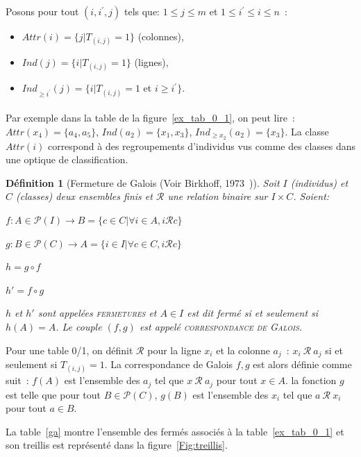 \documentclass[a4paper]{report}
\newtheorem{definition}{Définition}[chapter]
\begin{document}
Posons pour tout $(i, i^{'}, j)$ tels que: $1 \leq j \leq m$ et $1 \leq i^{'} \leq i \leq n$~:
\begin{itemize}
    \item $Attr(i) = \{j | T_{(i, j)} = 1 \}$ (colonnes),
    \item $Ind(j) = \{i | T_{(i, j)} = 1 \}$ (lignes),
    \item $Ind_{\geqslant i^{'}}(j) = \{i | T_{(i, j)} = 1$ et $i \geqslant i^{'} \}$.
\end{itemize}


\paragraph{}Par exemple dans la table de la figure~\ref{ex_tab_0_1}, on peut lire~: $Attr(x_4) = \{a_4, a_5 \}$, 
$Ind(a_2) = \{x_1, x_3 \}$,
$Ind_{\geqslant x_2}(a_2) = \{x_3 \}$. La classe
$Attr(i)$ correspond à des regroupements d'individus vus comme des classes dans une optique de classification.

\begin{definition}[Fermeture de Galois (Voir Birkhoff, 1973~\cite{birkhoff1973})]

Soit $I$ (\-individus) et $C$ (classes) deux ensembles finis et $\mathcal{R}$ une relation binaire sur $I \times C$.
Soient:

$f: A \in \mathcal{P}(I) \rightarrow B = \{c \in C | \forall i \in A, i \mathcal{R} c \} $

$g: B \in \mathcal{P}(C) \rightarrow A = \{i \in I | \forall c \in C, i \mathcal{R} c \} $

$h = g \circ f$

$h' = f \circ g$

$h$ et $h'$ sont appelées \textsc{fermetures} et $A \in I$ est dit fermé si et seulement si $h(A) = A$.
Le couple $(f, g)$ est appelé \textsc{correspondance de Galois}.
\end{definition}

Pour une table 0/1, on définit $\mathcal{R}$ pour la ligne $x_i$ et la colonne $a_j$~:
 $x_i~\mathcal{R}~a_j$ si et seulement si $T_{(i,j)} = 1$.
La correspondance de Galois $f,g$ est alors définie comme suit~: $f(A)$ est l'ensemble des $a_j$ tel que $x~\mathcal{R}~a_j$ pour tout $x \in A$.
 la fonction $g$ est telle que pour tout $B \in \mathcal{P}(C)$, $g(B)$ est l'ensemble des $x_i$ tel que $a~\mathcal{R}~x_i$ pour tout $a \in B$.

La table~\ref{ga} montre l'ensemble des fermés associés à la table~\ref{ex_tab_0_1} et son treillis est représenté dans la figure~\ref{Fig:treillis}.
\end{document}
